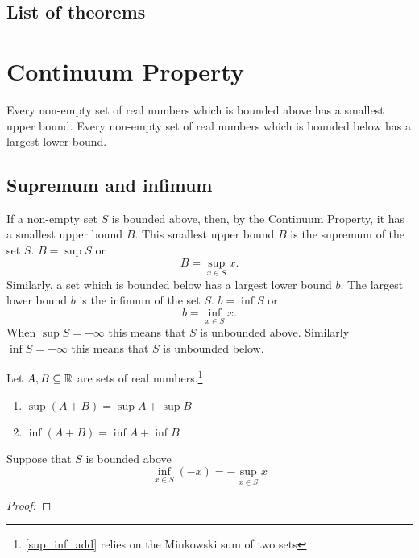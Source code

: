 \documentclass[10pt, a4paper]{article}
\begin{document}
\newpage

\subsection{List of theorems}

\listoftheorems[ignoreall, onlynamed, title={}, swapnumber]

\newpage

\section{Continuum Property}
Every non-empty set of real numbers which is bounded above has a smallest upper bound. Every non-empty set of real numbers which is bounded below has a largest lower bound.

\subsection{Supremum and infimum}
If a non-empty set $S$ is bounded above, then, by the Continuum Property, it has a smallest upper bound $B$. This smallest upper bound $B$ is the supremum of the set $S$. $B = \sup{S}$ or \\ $$B = \sup_{x \in S}{x}.$$
Similarly, a set which is bounded below has a largest lower bound $b$. The largest lower bound $b$ is the infimum of the set $S$. $b = \inf{S}$ or $$b = \inf_{x \in S}{x}.$$
When $\sup{S} = +\infty$ this means that $S$ is unbounded above. Similarly $\inf{S} = -\infty$ this means that $S$ is unbounded below.

\begin{theorem}\label{sup_inf_add}
    Let $A, B \subseteq \mathbb{R}$ are sets of real numbers.\footnote{\autoref{sup_inf_add} relies on the Minkowski sum of two sets}
    \begin{enumerate}[label = (\alph*)]
        \item $\sup{(A + B)} = \sup{A} + \sup{B}$
        \item $\inf{(A + B)} = \inf{A} + \inf{B}$
    \end{enumerate}
\end{theorem}

\begin{theorem}
    Suppose that $S$ is bounded above $$\inf_{x \in S}{(-x)} = -\sup_{x \in S}{x}$$
    \begin{proof}
        
    \end{proof}
\end{theorem}
\end{document}
